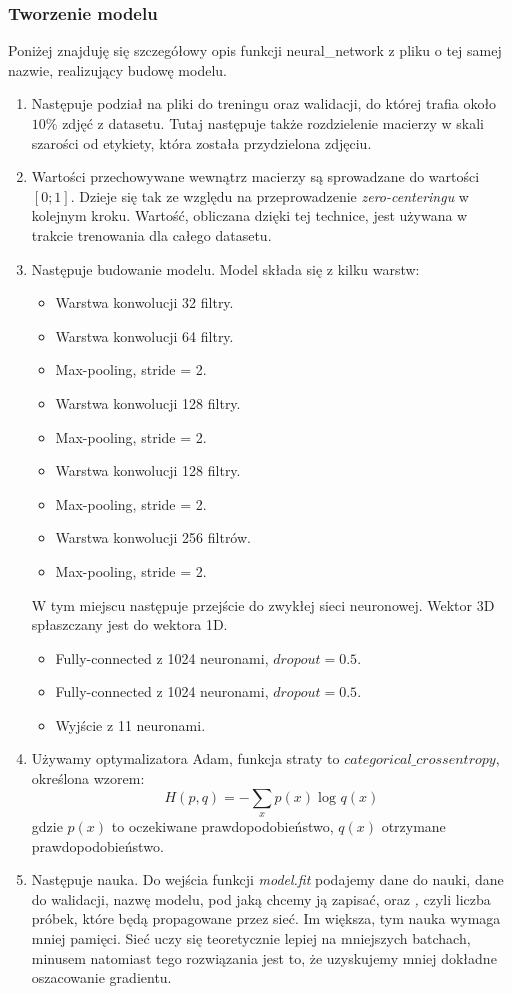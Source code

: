 \documentclass[12pt,a4paper]{article}
\begin{document}
    \subsubsection{Tworzenie modelu}
    Poniżej znajduję się szczegółowy opis funkcji neural\_network z pliku o tej samej nazwie, realizujący budowę modelu.
    \begin{enumerate}
        \item Następuje podział na pliki do treningu oraz walidacji, do której trafia około $10\%$ zdjęć z datasetu. Tutaj następuje także rozdzielenie macierzy w skali szarości od etykiety, która została przydzielona zdjęciu. 
        \item Wartości przechowywane wewnątrz macierzy są sprowadzane do wartości $\left[0;1\right]$. Dzieje się tak ze względu na przeprowadzenie \textit{zero-centeringu} w kolejnym kroku. Wartość, obliczana dzięki tej technice, jest używana w trakcie trenowania dla całego datasetu.
        \item Następuje budowanie modelu. Model składa się z kilku warstw:
        \begin{itemize}
            \item Warstwa konwolucji 32 filtry.
            \item Warstwa konwolucji 64 filtry.
            \item Max-pooling, stride = 2.
            \item Warstwa konwolucji 128 filtry.
            \item Max-pooling, stride = 2.
            \item Warstwa konwolucji 128 filtry.
            \item Max-pooling, stride = 2.
            \item Warstwa konwolucji 256 filtrów.
            \item Max-pooling, stride = 2.
        \end{itemize}
        W tym miejscu następuje przejście do zwykłej sieci neuronowej. Wektor 3D spłaszczany jest do wektora 1D.
        \begin{itemize}
            \item Fully-connected z 1024 neuronami, $dropout = 0.5$.
            \item Fully-connected z 1024 neuronami, $dropout = 0.5$.
            \item Wyjście z 11 neuronami.
        \end{itemize}
        \item Używamy optymalizatora Adam, funkcja straty to $categorical\_crossentropy$, określona wzorem:
        $$H(p,q)=-\sum_{x}p(x)\log_{}q(x)$$
        gdzie $p(x)$ to oczekiwane prawdopodobieństwo, $q(x)$ otrzymane prawdopodobieństwo.
        \item Następuje nauka. Do wejścia funkcji \textit{model.fit} podajemy dane do nauki, dane do walidacji, nazwę modelu, pod jaką chcemy ją zapisać, oraz \textit, czyli liczba próbek, które będą propagowane przez sieć. Im większa, tym nauka wymaga mniej pamięci. Sieć uczy się teoretycznie lepiej na mniejszych batchach, minusem natomiast tego rozwiązania jest to, że uzyskujemy mniej dokładne oszacowanie gradientu.
    \end{enumerate}
    
\end{document}
